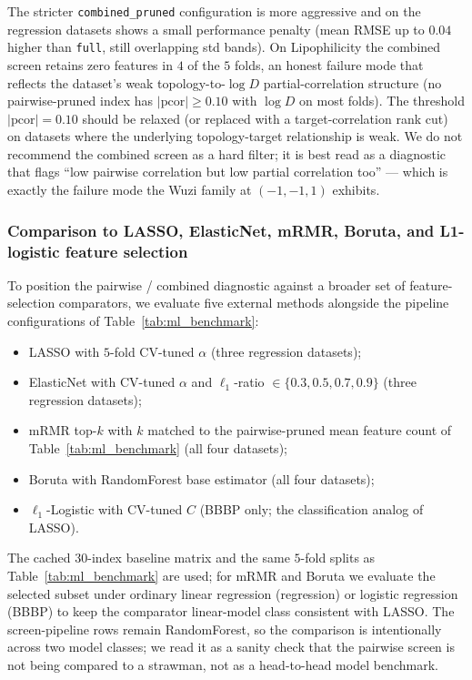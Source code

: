 \documentclass[STIX1COL]{WileyNJDv5}
\theoremstyle{definition}
\begin{document}
The stricter \texttt{combined\_pruned} configuration is more
aggressive and on the regression datasets shows a small performance
penalty (mean RMSE up to $0.04$ higher than \texttt{full}, still
overlapping std bands). On Lipophilicity the combined screen
retains zero features in $4$ of the $5$ folds, an honest failure
mode that reflects the dataset's weak topology-to-$\log D$
partial-correlation structure (no pairwise-pruned index has
$|\mathrm{pcor}| \ge 0.10$ with $\log D$ on most folds). The
threshold $|\mathrm{pcor}| = 0.10$ should be relaxed (or replaced
with a target-correlation rank cut) on datasets where the underlying
topology-target relationship is weak. We do not recommend the
combined screen as a hard filter; it is best read as a diagnostic
that flags ``low pairwise correlation but low partial correlation
too'' --- which is exactly the failure mode the Wuzi family at
$(-1,-1,1)$ exhibits.

\subsubsection{Comparison to LASSO, ElasticNet, mRMR, Boruta, and L1-logistic feature selection}\label{sub:lasso_comparator}

To position the pairwise / combined diagnostic against a broader
set of feature-selection comparators, we evaluate five external
methods alongside the pipeline configurations of
Table~\ref{tab:ml_benchmark}:
\begin{itemize}
\item LASSO with $5$-fold CV-tuned $\alpha$ (three regression datasets);
\item ElasticNet with CV-tuned $\alpha$ and $\ell_1$-ratio
$\in \{0.3, 0.5, 0.7, 0.9\}$ (three regression datasets);
\item mRMR top-$k$ with $k$ matched to the pairwise-pruned mean
feature count of Table~\ref{tab:ml_benchmark} (all four datasets);
\item Boruta with RandomForest base estimator (all four datasets);
\item $\ell_1$-Logistic with CV-tuned $C$ (BBBP only; the
classification analog of LASSO).
\end{itemize}
The cached $30$-index baseline matrix and the same $5$-fold splits
as Table~\ref{tab:ml_benchmark} are used; for mRMR and Boruta we
evaluate the selected subset under ordinary linear regression
(regression) or logistic regression (BBBP) to keep the comparator
linear-model class consistent with LASSO. The screen-pipeline rows
remain RandomForest, so the comparison is intentionally across two
model classes; we read it as a sanity check that the pairwise screen
is not being compared to a strawman, not as a head-to-head model
benchmark.
\end{document}

